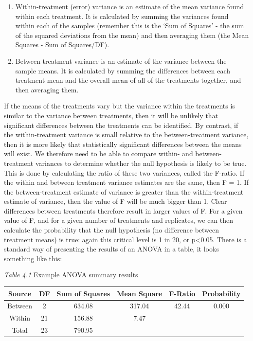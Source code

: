\documentclass[
]{book}
\providecommand{\tightlist}{%
  \setlength{\itemsep}{0pt}\setlength{\parskip}{0pt}}
\begin{document}
\begin{enumerate}
\def\labelenumi{\arabic{enumi})}
\tightlist
\item
  Within-treatment (error) variance is an estimate of the mean variance found within each treatment. It is calculated by summing the variances found within each of the samples (remember this is the `Sum of Squares' - the sum of the squared deviations from the mean) and then averaging them (the Mean Squares - Sum of Squares/DF).
\item
  Between-treatment variance is an estimate of the variance between the sample means. It is calculated by summing the differences between each treatment mean and the overall mean of all of the treatments together, and then averaging them.
\end{enumerate}

If the means of the treatments vary but the variance within the treatments is similar to the variance between treatments, then it will be unlikely that significant differences between the treatments can be identified. By contrast, if the within-treatment variance is small relative to the between-treatment variance, then it is more likely that statistically significant differences between the means will exist. We therefore need to be able to compare within- and between- treatment variances to determine whether the null hypothesis is likely to be true. This is done by calculating the ratio of these two variances, called the F-ratio. If the within and between treatment variance estimates are the same, then F = 1. If the between-treatment estimate of variance is greater than the within-treatment estimate of variance, then the value of F will be much bigger than 1. Clear differences between treatments therefore result in larger values of F. For a given value of F, and for a given number of treatments and replicates, we can then calculate the probability that the null hypothesis (no difference between treatment means) is true: again this critical level is 1 in 20, or p\textless0.05. There is a standard way of presenting the results of an ANOVA in a table, it looks something like this:

\emph{Table 4.1} Example ANOVA summary results

\begin{longtable}[]{@{}cccccc@{}}
\toprule\noalign{}
Source & DF & Sum of Squares & Mean Square & F-Ratio & Probability \\
\midrule\noalign{}
\endhead
\bottomrule\noalign{}
\endlastfoot
Between & 2 & 634.08 & 317.04 & 42.44 & 0.000 \\
Within & 21 & 156.88 & 7.47 & & \\
Total & 23 & 790.95 & & & \\
\end{longtable}
\end{document}
